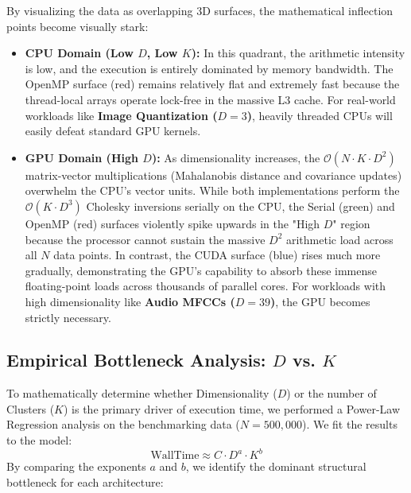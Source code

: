 \documentclass[10pt]{article}
\begin{document}
By visualizing the data as overlapping 3D surfaces, the mathematical inflection points become visually stark:
\begin{itemize}
    \item \textbf{CPU Domain (Low $D$, Low $K$):} In this quadrant, the arithmetic intensity is low, and the execution is entirely dominated by memory bandwidth. The OpenMP surface (red) remains relatively flat and extremely fast because the thread-local arrays operate lock-free in the massive L3 cache. For real-world workloads like \textbf{Image Quantization ($D=3$)}, heavily threaded CPUs will easily defeat standard GPU kernels.
    \item \textbf{GPU Domain (High $D$):} As dimensionality increases, the $\mathcal{O}(N \cdot K \cdot D^2)$ matrix-vector multiplications (Mahalanobis distance and covariance updates) overwhelm the CPU's vector units. While both implementations perform the $\mathcal{O}(K \cdot D^3)$ Cholesky inversions serially on the CPU, the Serial (green) and OpenMP (red) surfaces violently spike upwards in the "High $D$" region because the processor cannot sustain the massive $D^2$ arithmetic load across all $N$ data points. In contrast, the CUDA surface (blue) rises much more gradually, demonstrating the GPU's capability to absorb these immense floating-point loads across thousands of parallel cores. For workloads with high dimensionality like \textbf{Audio MFCCs ($D=39$)}, the GPU becomes strictly necessary.

\end{itemize}

\subsection{Empirical Bottleneck Analysis: $D$ vs. $K$}
To mathematically determine whether Dimensionality ($D$) or the number of Clusters ($K$) is the primary driver of execution time, we performed a Power-Law Regression analysis on the benchmarking data ($N=500,000$). We fit the results to the model:
\begin{equation}
\text{WallTime} \approx C \cdot D^a \cdot K^b
\end{equation}
By comparing the exponents $a$ and $b$, we identify the dominant structural bottleneck for each architecture:
\end{document}
